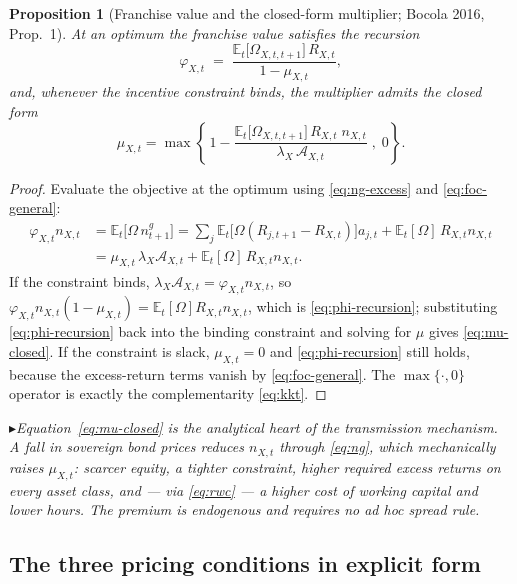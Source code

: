 \documentclass[11pt]{article}
\numberwithin{equation}{section}
\newcommand{\E}{\mathbb{E}}
\theoremstyle{definition}
\theoremstyle{plain}
\newtheorem{proposition}{Proposition}
\theoremstyle{remark}
\newcommand{\impl}[1]{\par\smallskip\noindent\textcolor{notec}{$\blacktriangleright$}\;\emph{#1}\par\smallskip}
\begin{document}
\begin{proposition}[Franchise value and the closed-form multiplier; Bocola 2016, Prop.~1]
\label{prop:mu}
At an optimum the franchise value satisfies the recursion
\begin{equation}
\varphi_{X,t}\;=\;\frac{\E_t\bigl[\Omega_{X,t,t+1}\bigr]\,R_{X,t}}{1-\mu_{X,t}},
\label{eq:phi-recursion}
\end{equation}
and, whenever the incentive constraint binds, the multiplier admits the closed form
\begin{equation}
\mu_{X,t}
=\max\left\{\,1-\frac{\E_t\bigl[\Omega_{X,t,t+1}\bigr]\,R_{X,t}\;n_{X,t}}
                     {\lambda_X\,\mathcal{A}_{X,t}}\;,\;0\right\}.
\label{eq:mu-closed}
\end{equation}
\end{proposition}

\begin{proof}
Evaluate the objective at the optimum using \eqref{eq:ng-excess} and
\eqref{eq:foc-general}:
\begin{align*}
\varphi_{X,t}n_{X,t}
&=\E_t\bigl[\Omega\,n^{g}_{t+1}\bigr]
 =\sum_j \E_t\bigl[\Omega(R_{j,t+1}-R_{X,t})\bigr]a_{j,t}
  +\E_t[\Omega]\,R_{X,t}n_{X,t}\\
&=\mu_{X,t}\,\lambda_X\mathcal{A}_{X,t}+\E_t[\Omega]\,R_{X,t}n_{X,t}.
\end{align*}
If the constraint binds, $\lambda_X\mathcal{A}_{X,t}=\varphi_{X,t}n_{X,t}$, so
$\varphi_{X,t}n_{X,t}(1-\mu_{X,t})=\E_t[\Omega]R_{X,t}n_{X,t}$, which is
\eqref{eq:phi-recursion}; substituting \eqref{eq:phi-recursion} back into the binding
constraint and solving for $\mu$ gives \eqref{eq:mu-closed}. If the constraint is
slack, $\mu_{X,t}=0$ and \eqref{eq:phi-recursion} still holds, because the excess-return
terms vanish by \eqref{eq:foc-general}. The $\max\{\cdot,0\}$ operator is exactly the
complementarity \eqref{eq:kkt}.
\end{proof}

\impl{Equation~\eqref{eq:mu-closed} is the analytical heart of the transmission
mechanism. A fall in sovereign bond prices reduces $n_{X,t}$ through
\eqref{eq:ng}, which \emph{mechanically} raises $\mu_{X,t}$: scarcer equity, a
tighter constraint, higher required excess returns on every asset class, and --- via
\eqref{eq:rwc} --- a higher cost of working capital and lower hours. The premium is
endogenous and requires no ad hoc spread rule.}

\subsection{The three pricing conditions in explicit form}
\end{document}
